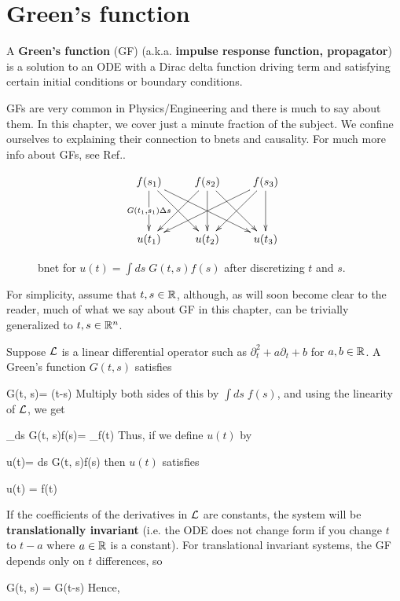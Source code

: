 \chapter{Green's function}
\label{ch-greens-fun}


A {\bf Green's function} (GF)
(a.k.a. {\bf impulse response
 function, propagator}) is a solution to an ODE 
 with a Dirac delta function driving term and satisfying certain
 initial conditions or boundary conditions. 
 
GFs are very common in Physics/Engineering and there is much
to say about them. In this chapter, we cover
just a minute fraction of the subject. We confine ourselves
to explaining their connection to bnets  and causality.
For much more info about GFs, see Ref.\cite{wiki-greens-fun}.

\begin{figure}[h!]
$$
\xymatrix@R=3pc{
f(s_1)\ar[d]|{G(t_1, s_1)\Delta s}
\ar[dr]\ar[drr]
&f(s_2)\ar[dl]\ar[d]\ar[dr]
&f(s_3)\ar[dll]\ar[dl]\ar[d]
\\
u(t_1)
&u(t_2)
&u(t_3)
}$$
\caption{bnet for 
$u(t)=  \int ds\; G(t, s)f(s)$
after discretizing $t$ and $s$.}
\label{eq-bnet-greens-fun}
\end{figure}

For simplicity, assume that $t, s\in { \mathbb{R}}$,
although, as will soon become clear to the reader,
much of what we say
about GF in this chapter,
can be trivially 
generalized to $t, s\in { \mathbb{R}}^n$.

Suppose ${\cal L}$ is a 
linear differential operator such as $\partial^2_t + a\partial_t + b$ for $a,b\in{ \mathbb{R}}$.
A Green's function $G(t,s)$ satisfies

\beq
\call G(t, s)= \delta(t-s)
\eeq
Multiply both sides of this by $\int ds\; f(s)$,
and using the linearity of ${\cal L}$, we get


\beq
{}_{\call\int ds\; G(t, s)f(s)}= 
_{f(t)}
\eeq
Thus, if we define $u(t)$ by

\beq
u(t)=  \int ds\; G(t, s)f(s)
\eeq
then $u(t)$ satisfies

\beq 
\call u(t) = f(t)
\eeq

If the coefficients of the derivatives in ${\cal L}$
are constants, the system will be {\bf translationally
invariant} (i.e. the ODE does not change
form if you change $t$ to $t-a$ where
$a\in{ \mathbb{R}}$ is a constant).
For translational invariant systems,
the GF depends only on $t$ differences, so

\beq
G(t, s) = G(t-s)
\eeq
Hence, 

